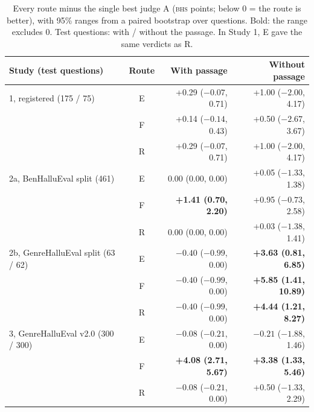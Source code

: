 \documentclass[11pt]{article}
\newcommand{\BHS}{\textsc{bhs}}
\begin{document}
\begin{table}[t]
\centering\small
\caption{Every route minus the single best judge A (\BHS{} points; below 0 = the route is better), with 95\% ranges
from a paired bootstrap over questions. Bold: the range excludes 0. Test questions: with / without the passage. In Study 1, E gave the same
verdicts as R.}\label{tab:main}
\begin{tabular}{@{}lcrr@{}}
\toprule
Study (test questions) & Route & With passage & Without passage \\
\midrule
1, registered (175 / 75) & E & +0.29 ($-0.07$, 0.71) & +1.00 ($-2.00$, 4.17) \\
 & F & +0.14 ($-0.14$, 0.43) & +0.50 ($-2.67$, 3.67) \\
 & R & +0.29 ($-0.07$, 0.71) & +1.00 ($-2.00$, 4.17) \\
\midrule
2a, BenHalluEval split (461) & E & 0.00 (0.00, 0.00) & +0.05 ($-1.33$, 1.38) \\
 & F & \textbf{+1.41 (0.70, 2.20)} & +0.95 ($-0.73$, 2.58) \\
 & R & 0.00 (0.00, 0.00) & +0.03 ($-1.38$, 1.41) \\
\midrule
2b, GenreHalluEval split (63 / 62) & E & $-0.40$ ($-0.99$, 0.00) & \textbf{+3.63 (0.81, 6.85)} \\
 & F & $-0.40$ ($-0.99$, 0.00) & \textbf{+5.85 (1.41, 10.89)} \\
 & R & $-0.40$ ($-0.99$, 0.00) & \textbf{+4.44 (1.21, 8.27)} \\
\midrule
3, GenreHalluEval v2.0 (300 / 300) & E & $-0.08$ ($-0.21$, 0.00) & $-0.21$ ($-1.88$, 1.46) \\
 & F & \textbf{+4.08 (2.71, 5.67)} & \textbf{+3.38 (1.33, 5.46)} \\
 & R & $-0.08$ ($-0.21$, 0.00) & +0.50 ($-1.33$, 2.29) \\
\bottomrule
\end{tabular}
\end{table}
\end{document}
